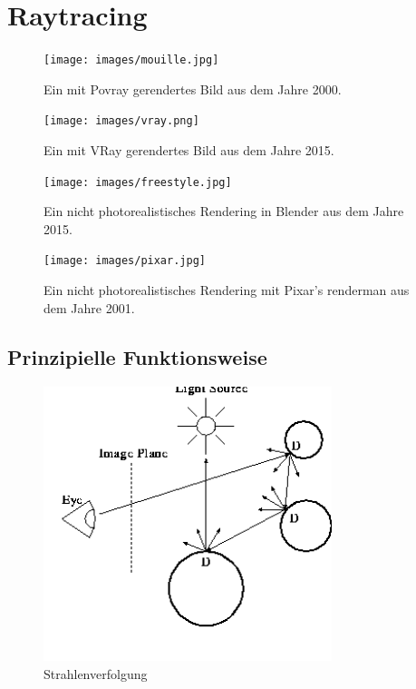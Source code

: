 \section{Raytracing}
 
\begin{figure}[H]
    \centering
    \texttt{[image: images/mouille.jpg]}
    \caption{Ein mit Povray gerendertes Bild aus dem Jahre 2000.}
    \label{fig:povray}
\end{figure}


 \begin{figure}[H]
    \centering
    \texttt{[image: images/vray.png]}
    \caption{Ein mit VRay gerendertes Bild aus dem Jahre 2015.}
    \label{fig:cray}
\end{figure}


 \begin{figure}[H]
    \centering
    \texttt{[image: images/freestyle.jpg]}
    \caption{Ein nicht photorealistisches Rendering in Blender aus dem Jahre 2015.}
    \label{fig:cray}
\end{figure}


 \begin{figure}[H]
    \centering
    \texttt{[image: images/pixar.jpg]}
    \caption{Ein nicht photorealistisches Rendering mit Pixar's renderman aus dem Jahre 2001.}
    \label{fig:cray}
\end{figure}

\subsection{Prinzipielle Funktionsweise}
 \begin{figure}[H]
    \centering
    \includegraphics[width=0.75\textwidth]{images/rayTracing.png}
    \caption{Strahlenverfolgung}
    \label{fig:diffus}
\end{figure}



